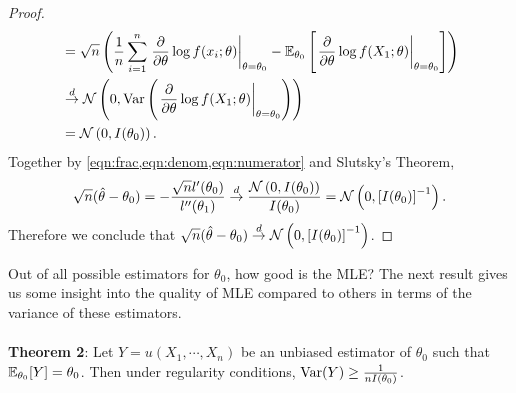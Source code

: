 \begin{proof}
\begin{align}
&= \sqrt{n}\left( \frac{1}{n}\sum_{i=1}^n \left.\frac{\partial}{\partial\theta}\log f(x_i;\theta)\right\vert_{\theta=\theta_0} - \mathbb{E}_{\theta_0}\left[ \left.\frac{\partial}{\partial\theta}\log f(X_1;\theta)\right\vert_{\theta=\theta_0} \right] \right)\\
&\overset{d}{\rightarrow} \mathcal{N}\left(0, \text{Var}\left( \left.\frac{\partial}{\partial\theta}\log f(X_1;\theta)\right\vert_{\theta=\theta_0} \right)\right)\\
&= \mathcal{N}\left( 0, I(\theta_0) \right). \label{eqn:numerator}
\end{align}
Together by \cref{eqn:frac,eqn:denom,eqn:numerator} and Slutsky's Theorem,
\begin{align}
\sqrt{n}(\hat{\theta} - \theta_0) = -\frac{\sqrt{n}l'(\theta_0)}{l''(\theta_1)} \overset{d}{\rightarrow} \frac{\mathcal{N}\left(0,I(\theta_0)\right)}{I(\theta_0)} = \mathcal{N}\left(0, \left[ I(\theta_0) \right]^{-1}\right).
\end{align}
Therefore we conclude that $\sqrt{n}(\hat{\theta} - \theta_0)\overset{d}{\rightarrow}\mathcal{N}\left(0, \left[ I(\theta_0) \right]^{-1}\right)$.
\end{proof}
$ $\\
Out of all possible estimators for $\theta_0$, how good is the MLE? The next result gives us some insight into the quality of MLE compared to others in terms of the variance of these estimators.\\\\
\textbf{Theorem 2}: Let $Y = u(X_1,\cdots,X_n)$ be an unbiased estimator of $\theta_0$ such that $\mathbb{E}_{\theta_0}[Y] = \theta_0$. Then under regularity conditions, $\text{Var}(Y) \geq \frac{1}{nI(\theta_0)}$.
